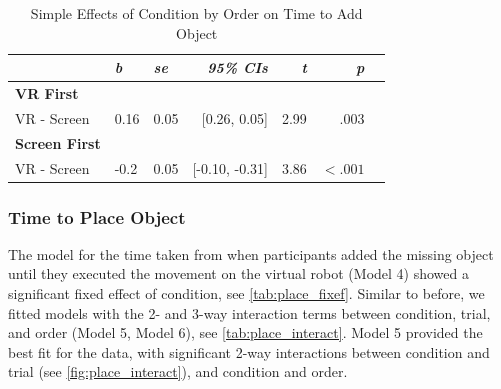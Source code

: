 \documentclass[letterpaper, 10 pt, conference]{ieeeconf}  %
\begin{document}
\begin{table}[h!]
    \caption{Simple Effects of Condition by Order on Time to Add Object}
    \centering
    \footnotesize
    \label{tab:posthoc_add_conditionxorder}
    \begin{tabular}{lllrrrr}
        \toprule
         &  \textit{b} & \textit{se} & \textit{95\% CIs} &\textit{t} & \textit{p} \\ 
         \midrule
         \textbf{VR First} & & & & & \\
            VR - Screen & 0.16 & 0.05 & [0.26, 0.05] & 2.99 & .003 \\  \midrule
        \textbf{Screen First} & & & & & \\
            VR - Screen & -0.2 & 0.05 & [-0.10, -0.31] & 3.86 & $<.001$ \\  
        \bottomrule
    \end{tabular}
    
    \end{table}

\subsubsection{Time to Place Object}
The model for the time taken from when participants added the missing object until they executed the movement on the virtual robot (Model 4) showed a significant fixed effect of condition, see \cref{tab:place_fixef}. Similar to before, we fitted models with the 2- and 3-way interaction terms between condition, trial, and order (Model 5, Model 6), see \cref{tab:place_interact}. Model 5 provided the best fit for the data, with significant 2-way interactions between condition and trial (see \cref{fig:place_interact}), and condition and order. 
\end{document}

